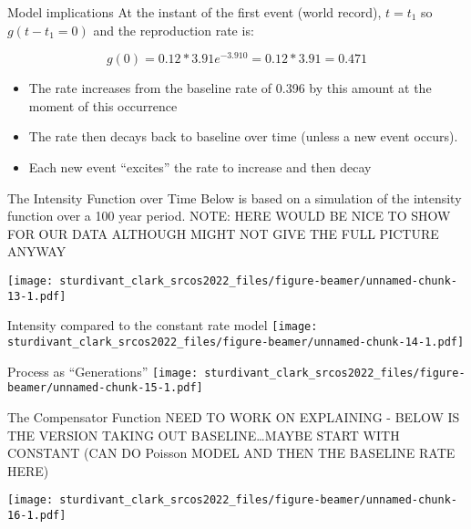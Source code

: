 \documentclass[
  ignorenonframetext,
]{beamer}
\begin{document}
\begin{frame}{Model implications}
\protect\hypertarget{model-implications}{}
At the instant of the first event (world record), \(t = t_1\) so
\(g(t - t_1 = 0)\) and the reproduction rate is:

\[g(0) = 0.12 * 3.91 e^{-3.91 0} = 0.12 * 3.91 =  0.471 \]

\begin{itemize}
\item
  The rate increases from the baseline rate of 0.396 by this amount at
  the moment of this occurrence
\item
  The rate then decays back to baseline over time (unless a new event
  occurs).
\item
  Each new event ``excites'' the rate to increase and then decay
\end{itemize}
\end{frame}

\begin{frame}{The Intensity Function over Time}
\protect\hypertarget{the-intensity-function-over-time}{}
Below is based on a simulation of the intensity function over a 100 year
period. NOTE: HERE WOULD BE NICE TO SHOW FOR OUR DATA ALTHOUGH MIGHT NOT
GIVE THE FULL PICTURE ANYWAY

\texttt{[image: sturdivant\_clark\_srcos2022\_files/figure-beamer/unnamed-chunk-13-1.pdf]}
\end{frame}

\begin{frame}{Intensity compared to the constant rate model}
\protect\hypertarget{intensity-compared-to-the-constant-rate-model}{}
\texttt{[image: sturdivant\_clark\_srcos2022\_files/figure-beamer/unnamed-chunk-14-1.pdf]}
\end{frame}

\begin{frame}{Process as ``Generations''}
\protect\hypertarget{process-as-generations}{}
\texttt{[image: sturdivant\_clark\_srcos2022\_files/figure-beamer/unnamed-chunk-15-1.pdf]}
\end{frame}

\begin{frame}{The Compensator Function}
\protect\hypertarget{the-compensator-function}{}
NEED TO WORK ON EXPLAINING - BELOW IS THE VERSION TAKING OUT
BASELINE\ldots MAYBE START WITH CONSTANT (CAN DO Poisson MODEL AND THEN
THE BASELINE RATE HERE)

\texttt{[image: sturdivant\_clark\_srcos2022\_files/figure-beamer/unnamed-chunk-16-1.pdf]}
\end{frame}
\end{document}
